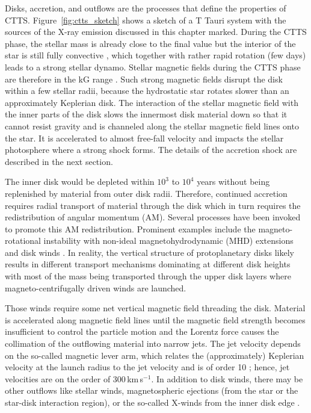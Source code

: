 Disks, accretion, and outflows are the processes that define the properties of CTTS. Figure~\ref{fig:ctts_sketch} shows a sketch of a T Tauri system with the sources of the X-ray emission discussed in this chapter marked.
During the CTTS phase, the stellar mass is already close to the final value but the interior of the star is still fully convective \citep{Stahler_2004}, which together with rather rapid rotation (few days) leads to a strong stellar dynamo. Stellar magnetic fields during the CTTS phase are therefore in the kG range \cite{2008MNRAS.386.1234D,2010MNRAS.402.1426D}. Such strong magnetic fields disrupt the disk within a few stellar radii, because the hydrostatic star rotates slower than an approximately Keplerian disk. The interaction of the stellar magnetic field with the inner parts of the disk slows the innermost disk material down so that it cannot resist gravity and is channeled along the stellar magnetic field lines onto the star. It is accelerated to almost free-fall velocity and impacts the stellar photosphere where a strong shock forms. The details of the accretion shock are described in the next section.

The inner disk would be depleted within $10^3$ to $10^4$ years without being replenished by material from outer disk radii. Therefore, continued accretion requires radial transport of material through the disk which in turn requires the redistribution of angular momentum (AM). Several processes have been invoked to promote this AM redistribution. Prominent examples include the magneto-rotational instability \citep[MRI,][]{Balbus_1991} with non-ideal magnetohydrodynamic (MHD) extensions and disk winds \citep{Blandford_1982, Pudritz_1983}. In reality, the vertical structure of protoplanetary disks likely results in different transport mechanisms dominating at different disk heights with most of the mass being transported through the upper disk layers where magneto-centrifugally driven winds are launched.

Those winds require some net vertical magnetic field threading the disk. Material is accelerated along magnetic field lines until the magnetic field strength becomes insufficient to control the particle motion and the Lorentz force causes the collimation of the outflowing material into narrow jets. The jet velocity depends on the so-called magnetic lever arm, which relates the (approximately) Keplerian velocity at the launch radius to the jet velocity and is of order 10 \citep{Ferreira_2006}; hence, jet velocities are on the order of 300\,km\,s$^{-1}$. In addition to disk winds, there may be other outflows like stellar winds, magnetospheric ejections (from the star or the star-disk interaction region), or the so-called X-winds from the inner disk edge \citep{Shu_1994}.

